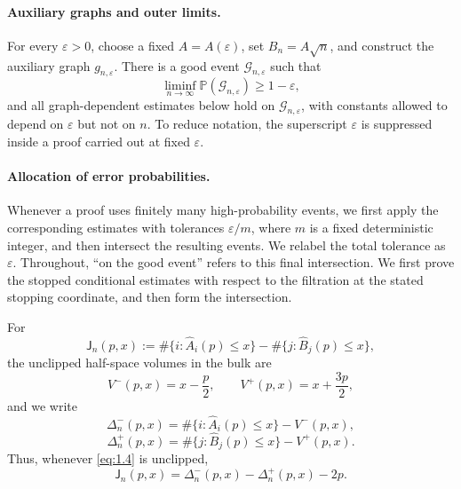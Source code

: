 \documentclass[11pt,reqno]{amsart}
\theoremstyle{definition}
\theoremstyle{remark}
\numberwithin{equation}{section}
\newcommand{\Pp}{\mathbb P}
\begin{document}
\paragraph{Auxiliary graphs and outer limits.}
For every \(\varepsilon>0\), choose a fixed \(A=A(\varepsilon)\), set
\(B_n=A\sqrt n\), and construct the auxiliary graph
\(g_{n,\varepsilon}\).  There is a good event
\(\mathcal G_{n,\varepsilon}\) such that
\begin{equation}
\liminf_{n\to\infty}\Pp(\mathcal G_{n,\varepsilon})
\ge 1-\varepsilon,
\label{eq:1.2a}
\end{equation}
and all graph-dependent estimates below hold on
\(\mathcal G_{n,\varepsilon}\), with constants allowed to depend on
\(\varepsilon\) but not on \(n\).  To reduce notation, the superscript
\(\varepsilon\) is suppressed inside a proof carried out at fixed
\(\varepsilon\).

\paragraph{Allocation of error probabilities.}
Whenever a proof uses finitely many high-probability events, we
first apply the corresponding estimates with tolerances
\(\varepsilon/m\), where \(m\) is a fixed deterministic integer, and
then intersect the resulting events.  We relabel the total tolerance as
\(\varepsilon\).  Throughout, ``on the good event'' refers to this final
intersection.  We first prove the stopped conditional estimates with respect
to the filtration at the stated stopping coordinate, and then form the
intersection.

For
\begin{equation}
\mathsf J_n(p,x)
:=
\#\{i:\widehat A_i(p)\le x\}
-
\#\{j:\widehat B_j(p)\le x\},
\label{eq:1.3}
\end{equation}
the unclipped half-space volumes in the bulk are
\begin{equation}
V^-(p,x)=x-\frac p2,\qquad
V^+(p,x)=x+\frac{3p}{2},
\label{eq:1.4}
\end{equation}
and we write
\[
\Delta_n^-(p,x)
=
\#\{i:\widehat A_i(p)\le x\}-V^-(p,x),
\]
\begin{equation}
\Delta_n^+(p,x)
=
\#\{j:\widehat B_j(p)\le x\}-V^+(p,x).
\label{eq:1.5}
\end{equation}
Thus, whenever \eqref{eq:1.4} is unclipped,
\begin{equation}
\boxed{
\mathsf J_n(p,x)
=
\Delta_n^-(p,x)-\Delta_n^+(p,x)-2p .
}
\label{eq:1.6}
\end{equation}
\end{document}

